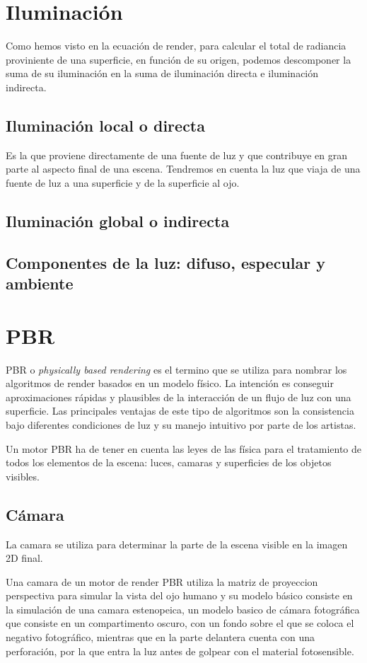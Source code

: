\section{Iluminaci\'on}
    Como hemos visto en la ecuaci\'on de render, para calcular el total de radiancia proviniente de una superficie, en funci\'on de
    su origen, podemos descomponer la suma de su iluminaci\'on en la suma de iluminaci\'on directa e iluminaci\'on indirecta.
    \subsection{Iluminaci\'on local o directa}
        Es la que proviene directamente de una fuente de luz y que contribuye en gran parte al aspecto final de una escena. Tendremos
        en cuenta la luz que viaja de una fuente de luz a una superficie y de la superficie al ojo.
    \subsection{Iluminaci\'on global o indirecta}
    \subsection{Componentes de la luz: difuso, especular y ambiente}

\section{PBR}
    PBR o \textit{physically based rendering} es el termino que se utiliza para nombrar los algoritmos de render basados en un modelo f\'isico.
    La intenci\'on es conseguir aproximaciones r\'apidas y plausibles de la interacci\'on de un flujo de luz con una superficie. Las
    principales ventajas de este tipo de algoritmos son la consistencia bajo diferentes condiciones de luz y su manejo intuitivo por
    parte de los artistas.

    Un motor PBR ha de tener en cuenta las leyes de las f\'isica para el tratamiento de todos los elementos de la escena: luces, camaras
    y superficies de los objetos visibles.

    \subsection{C\'amara}
    La camara se utiliza para determinar la parte de la escena visible en la imagen 2D final.

    Una camara de un motor de render PBR utiliza la matriz de proyeccion perspectiva para simular la
    vista del ojo humano y su modelo b\'asico consiste en la simulaci\'on de una camara estenopeica, un modelo basico de c\'amara fotogr\'afica que
    consiste en un compartimento oscuro, con un fondo sobre el que se coloca el negativo fotogr\'afico, mientras que en la parte delantera cuenta
    con una perforaci\'on, por la que entra la luz antes de golpear con el material fotosensible.


